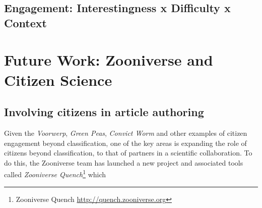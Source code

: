 \documentclass{sigchi}
\begin{document}
%

\subsection{Engagement: Interestingness x Difficulty x Context}

\section{Future Work: Zooniverse and Citizen Science}

\subsection{Involving citizens in article authoring}

Given the \emph{Voorwerp}, \emph{Green Peas}, \emph{Convict Worm} and other examples of citizen engagement beyond classification, one of the key areas is expanding the role of citizens beyond classification, to that of partners in a scientific collaboration.  To do this, the Zooniverse team has launched a new project and associated tools called \emph{Zooniverse Quench}\footnote{Zooniverse Quench \url{http://quench.zooniverse.org}} which 


\end{document}
